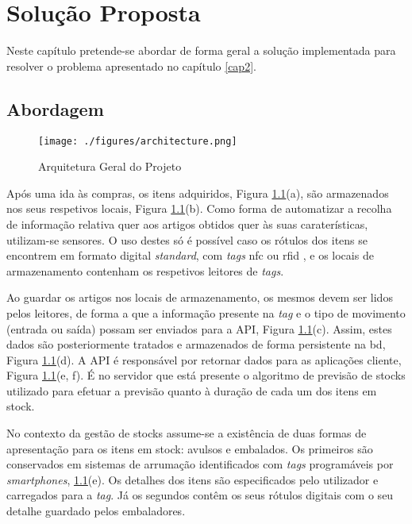 %
%
\chapter{Solução Proposta} \label{cap3}

Neste capítulo pretende-se abordar de forma geral a solução implementada para resolver o problema apresentado no capítulo \ref{cap2}.

%
%
\section{Abordagem}\label{sec31}

\begin{figure}[H]
	\centering
	\texttt{[image: ./figures/architecture.png]}
	\caption{Arquitetura Geral do Projeto}
	\label{project-general-architecture}
\end{figure}

Após uma ida às compras, os itens adquiridos, Figura \ref{project-general-architecture}(a), são armazenados nos seus respetivos locais, Figura \ref{project-general-architecture}(b). Como forma de automatizar a recolha de informação relativa quer aos artigos obtidos quer às suas caraterísticas, utilizam-se sensores. O uso destes só é possível caso os rótulos dos itens se encontrem em formato digital \textit{standard}, com \textit{tags} \acrfull{nfc} \cite{nfcforum:nfc} ou \acrfull{rfid} \cite{rfidinc:rfid}, e os locais de armazenamento contenham os respetivos leitores de \textit{tags}.

Ao guardar os artigos nos locais de armazenamento, os mesmos devem ser lidos pelos leitores, de forma a que a informação presente na \textit{tag} e o tipo de movimento (entrada ou saída) possam ser enviados para a API, Figura \ref{project-general-architecture}(c). Assim, estes dados são posteriormente tratados e armazenados de forma persistente na \acrfull{bd}, Figura \ref{project-general-architecture}(d). A API é responsável por retornar dados para as aplicações cliente, Figura \ref{project-general-architecture}(e, f). É no servidor que está presente o algoritmo de previsão de stocks utilizado para efetuar a previsão quanto à duração de cada um dos itens em stock.

No contexto da gestão de stocks assume-se a existência de duas formas de apresentação para os itens em stock: avulsos e embalados. Os primeiros são conservados em sistemas de arrumação identificados com \textit{tags} programáveis por \textit{smartphones}, \ref{project-general-architecture}(e). Os detalhes dos itens são especificados pelo utilizador e carregados para a \textit{tag}. Já os segundos contêm os seus rótulos digitais com o seu detalhe guardado pelos embaladores.\\

